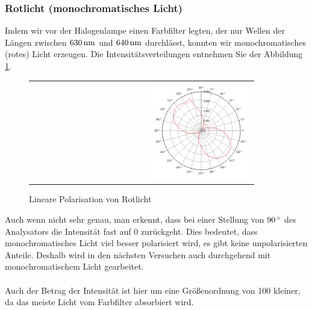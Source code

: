 \documentclass[a4paper,titlepage]{scrartcl}
\numberwithin{equation}{section}
\begin{document}
\subsubsection{Rotlicht (monochromatisches Licht)}
Indem wir vor der Halogenlampe einen Farbfilter legten, der nur Wellen der Längen zwischen $\unit[630]{nm}$ und $\unit[640]{nm}$ durchlässt, konnten wir monochromatisches (rotes) Licht erzeugen. Die Intensitätsverteilungen entnehmen Sie der Abbildung \ref{fig:aufgabe1b}.
\begin{figure}[H]
	\centering
	\begin{tabular}{@{}r@{}}
		\includegraphics[width=0.45\textwidth]{bilder/1b.png}\\
	\end{tabular}
	\caption{Lineare Polarisation von Rotlicht}
	\label{fig:aufgabe1b}
\end{figure}
Auch wenn nicht sehr genau, man erkennt, dass bei einer Stellung von $\unit[90]{^\circ}$ des Analysators die Intensität fast auf 0 zurückgeht. Dies bedeutet, dass monochromatisches Licht viel besser polarisiert wird, es gibt keine unpolarisierten Anteile. Deshalb wird in den nächsten Versuchen auch durchgehend mit monochromatischem Licht gearbeitet.\\ \\
Auch der Betrag der Intensität ist hier um eine Größenordnung von 100 kleiner, da das meiste Licht vom Farbfilter absorbiert wird.
\end{document}
